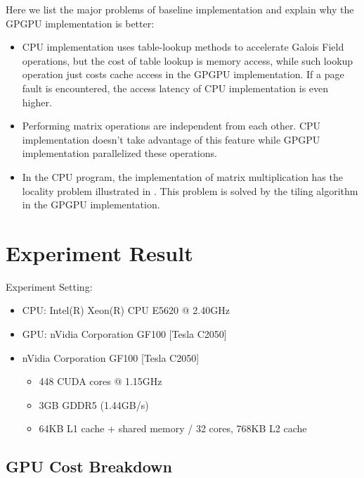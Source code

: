 \documentclass[a4paper]{article}
\begin{document}
Here we list the major problems of baseline implementation and explain why the GPGPU implementation is better:
\begin{itemize}
\item	CPU implementation uses table-lookup methods to accelerate Galois Field operations, but the cost of table lookup is memory access, while such lookup operation just costs cache access in the GPGPU implementation.				
If a page fault is encountered, the access latency of CPU implementation is even higher.
\item	Performing matrix operations are independent from each other. CPU implementation doesn't take advantage of this feature while GPGPU implementation parallelized these operations.
\item	In the CPU program, the implementation of matrix multiplication has the locality problem illustrated in \cite{hennessy2012computer}. This problem is solved by the tiling algorithm in the GPGPU implementation.  
\end{itemize}

\section{Experiment Result}
Experiment Setting:
\begin{itemize}
  \item CPU: Intel(R) Xeon(R) CPU E5620  @ 2.40GHz
  \item GPU: nVidia Corporation GF100 [Tesla C2050]
  \item nVidia Corporation GF100 [Tesla C2050]
	\begin{itemize}
	  \item 448 CUDA cores @ 1.15GHz
	  \item 3GB GDDR5 (1.44GB/s)
	  \item 64KB L1 cache + shared memory / 32 cores, 768KB L2 cache
	\end{itemize}
\end{itemize}

\subsection{GPU Cost Breakdown}
\end{document}
